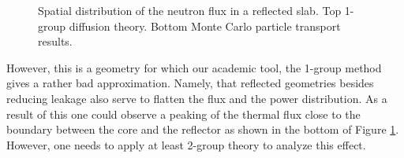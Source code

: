 \begin{figure}[ht!]
\protect {}\protect
\caption{\label{fig:reflected} \footnotesize{Spatial distribution of the neutron flux in a reflected slab. Top 1-group diffusion theory. Bottom Monte Carlo particle transport results.}}
\end{figure} 

However, this is a geometry for which our academic tool, the 1-group method gives a rather bad approximation. Namely, that reflected geometries besides reducing leakage also serve to flatten the flux and the power distribution. As a result of this one could observe a peaking of the thermal flux close to the boundary between the core and the reflector as shown in the bottom of Figure \ref{fig:reflected}. However, one needs to apply at least 2-group theory to analyze this effect.


